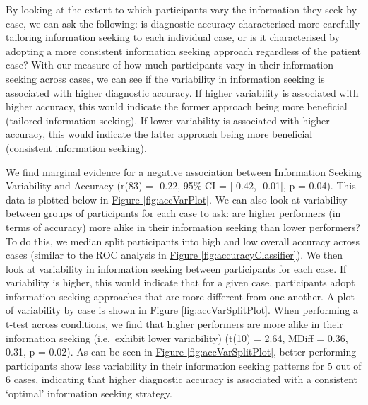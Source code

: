 \documentclass[a4paper, nobind]{templates/ociamthesis}
\begin{document}
By looking at the extent to which participants vary the information they seek by case, we can ask the following: is diagnostic accuracy characterised more carefully tailoring information seeking to each individual case, or is it characterised by adopting a more consistent information seeking approach regardless of the patient case? With our measure of how much participants vary in their information seeking across cases, we can see if the variability in information seeking is associated with higher diagnostic accuracy. If higher variability is associated with higher accuracy, this would indicate the former approach being more beneficial (tailored information seeking). If lower variability is associated with higher accuracy, this would indicate the latter approach being more beneficial (consistent information seeking).

\hfill\break
We find marginal evidence for a negative association between Information Seeking Variability and Accuracy (r(83) = -0.22, 95\% CI = {[}-0.42, -0.01{]}, p = 0.04). This data is plotted below in \hyperref[fig:accVarPlot]{Figure \ref{fig:accVarPlot}}. We can also look at variability between groups of participants for each case to ask: are higher performers (in terms of accuracy) more alike in their information seeking than lower performers? To do this, we median split participants into high and low overall accuracy across cases (similar to the ROC analysis in \hyperref[fig:accuracyClassifier]{Figure \ref{fig:accuracyClassifier}}). We then look at variability in information seeking between participants for each case. If variability is higher, this would indicate that for a given case, participants adopt information seeking approaches that are more different from one another. A plot of variability by case is shown in \hyperref[fig:accVarSplitPlot]{Figure \ref{fig:accVarSplitPlot}}. When performing a t-test across conditions, we find that higher performers are more alike in their information seeking (i.e.~exhibit lower variability) (t(10) = 2.64, MDiff = 0.36, 0.31, p = 0.02). As can be seen in \hyperref[fig:accVarSplitPlot]{Figure \ref{fig:accVarSplitPlot}}, better performing participants show less variability in their information seeking patterns for 5 out of 6 cases, indicating that higher diagnostic accuracy is associated with a consistent `optimal' information seeking strategy.
\end{document}
